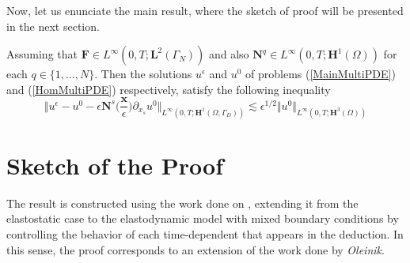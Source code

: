 

Now, let us enunciate the main result, where the sketch of proof will be presented in the next section.
\begin{theo}
Assuming that $\mathbf{F} \in L^{\infty}(0,T;\mathbf{L}^{2}(\Gamma_N))$ and also $\mathbf{N}^q \in L^{\infty}(0,T; \mathbf{H}^1(\Omega))$ for each $q \in \{1,\dots, N\}$. Then the solutions $u^{\epsilon}$ and $u^0$ of problems (\ref{MainMultiPDE}) and (\ref{HomMultiPDE}) respectively, satisfy the following inequality
\begin{equation*}
    \label{MainInequality}
    \Vert u^{\epsilon} - u^0 - \epsilon \mathbf{N}^s \big(\frac{\mathbf{x}}{\epsilon} \big) \partial_{x_s} u^0 \Vert_{L^{\infty}(0,T; \mathbf{H}^1(\Omega, \Gamma_D))} \lesssim \epsilon^{1/2} \Vert u^0 \Vert_{L^{\infty}(0,T; \mathbf{H}^{3}(\Omega))}
\end{equation*}
\end{theo}

\section{Sketch of the Proof}
The result is constructed using the work done on \cite{oleinik1992mathematical}, extending it from the elastostatic case to the elastodynamic model with mixed boundary conditions by controlling the behavior of each time-dependent that appears in the deduction. In this sense, the proof corresponds to an extension of the work done by \textit{Oleinik}.

